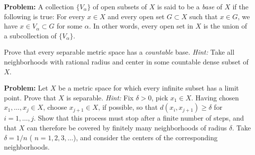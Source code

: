 \documentclass[10pt]{article}
\newenvironment{problem}{\textbf{Problem:}}{}
\begin{document}
	\begin{problem}
		A collection \( \{V_\alpha\}  \) of open subsets of \( X \) is said to be a \textit{base} of \( X \) 
		if the following is true: For every \( x \in X \) and every open set \( G \subset X \) 
		such that \( x \in G \), we have \( x \in V_\alpha \subset G \) for some 
		\( \alpha \). In other words, every open set in  \( X \) is the union of a subcollection of 
		\( \{V_\alpha\}  \). 

		Prove that every separable metric space has a \textit{countable} base. \textit{Hint:} Take 
		all neighborhoods with rational radius and center in some countable dense subset of \( X \).   
	\end{problem}

	\begin{problem}
		Let \( X \) be a metric space for which every infinite subset has a limit point. Prove that 
		\( X \) is separable. \textit{Hint:} Fix \( \delta > 0 \), pick \( x_1 \in X \). Having chosen 
		\( x_1, \dots, x_j \in X \), choose \( x_{j+1} \in X \), if possible, so that \( d(x_i, x_{j+1})
		\ge  \delta \) for \( i = 1, \dots, j \). Show that this process must stop after a finite number of 
		steps, and that \( X \) can therefore be covered by finitely many neighborhoods of radius \( \delta \). 
		Take \( \delta = 1 / n \) ( \( n = 1, 2, 3, \dots \)), and consider the centers of the corresponding
		neighborhoods. 
	\end{problem}
\end{document}
